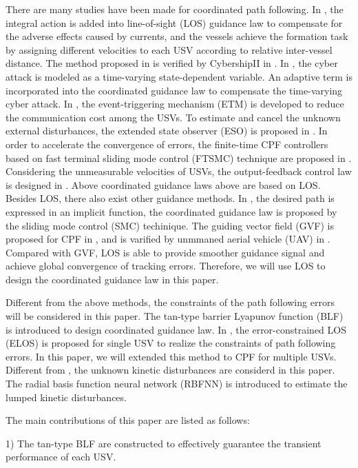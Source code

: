 \documentclass[a4paper,fleqn]{cas-dc}
\begin{document}
There are many studies have been made for coordinated path following. In \cite{bib1}, the integral action is added into line-of-sight (LOS) guidance law to compensate for the adverse effects caused by currents, and the vessels achieve the formation task by assigning different velocities to each USV according to relative inter-vessel distance. The method proposed in \cite{bib1} is verified by CybershipII in \cite{bib2}. In \cite{bib3}, the cyber attack is modeled as a time-varying state-dependent variable. An adaptive term is incorporated into the coordinated guidance law to compensate the time-varying cyber attack. In \cite{bib4}, the event-triggering mechanism (ETM) is developed to reduce the communication cost among the USVs.  To estimate and cancel the unknown external disturbances, the extended state observer (ESO) is proposed in \cite{bib5}. In order to accelerate the convergence of errors, the finite-time CPF controllers based on fast terminal sliding mode control (FTSMC) technique are proposed in \cite{bib6}. Considering the unmeasurable velocities of USVs, the output-feedback control law is designed in \cite{bib7}. Above coordinated guidance laws above are based on LOS. Besides LOS, there also exist other guidance methods. In \cite{bib8}, the desired path is expressed in an implicit function, the coordinated guidance law is proposed by the sliding mode control (SMC) techinique. The guiding vector field (GVF) is proposed for CPF in \cite{bib9}, and is varified by unmmaned aerial vehicle (UAV) in \cite{bib10}.  Compared with GVF, LOS is able to provide smoother guidance signal and achieve global convergence of tracking errors. Therefore, we will use LOS to design the coordinated guidance law in this paper. 

Different from the above methods, the constraints of the path following errors will be considered in this paper. The tan-type barrier Lyapunov function (BLF) is introduced to design coordinated guidance law. In \cite{bib11}, the error-constrained LOS (ELOS) is proposed for single USV to realize the constraints of path following errors. In this paper, we will extended this method to CPF for multiple USVs. Different from \cite{bib12}, the unknown kinetic disturbances are considerd in this paper. The radial basis function neural network (RBFNN) is introduced to estimate the lumped kinetic disturbances. 

The main contributions of this paper are listed as follows:

1) The tan-type BLF are constructed to effectively guarantee the transient performance of each USV.
\end{document}
